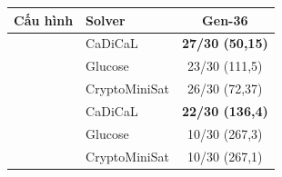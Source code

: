 \begin{tabular}{llc}
\toprule
Cấu hình & Solver & Gen-36 \\
\midrule
{} & CaDiCaL & \textbf{27/30 (50,15)} \\
 & Glucose & 23/30 (111,5) \\
 & CryptoMiniSat & 26/30 (72,37) \\
\midrule
{} & CaDiCaL & \textbf{22/30 (136,4)} \\
 & Glucose & 10/30 (267,3) \\
 & CryptoMiniSat & 10/30 (267,1) \\
\bottomrule
\end{tabular}
